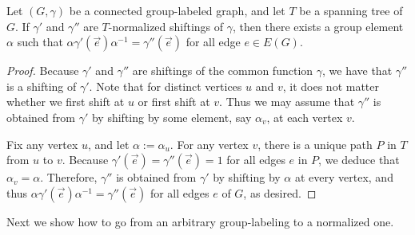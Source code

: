 \documentclass[a4paper, 12pt]{article}
\newcommand{\RMM}[1]{\textcolor{orange}{RM: #1}}
\begin{document}
\begin{lemma}
\label{lem:normalizedShifting1}
    Let $(G,\gamma)$ be a connected group-labeled graph, and let $T$ be a spanning tree of $G$. If $\gamma'$ and $\gamma''$ are $T$-normalized shiftings of $\gamma$, then there exists a group element $\alpha$ such that $\alpha \gamma'(\vec{e}) \alpha^{-1} = \gamma''(\vec{e})$ for all edge $e \in E(G)$.
\end{lemma}
\begin{proof}
    Because $\gamma'$ and $\gamma''$ are shiftings of the common function $\gamma$, we have that $\gamma''$ is a shifting of $\gamma'$. Note that for distinct vertices $u$ and $v$, it does not matter whether we first shift at $u$ or first shift at $v$. Thus we may assume that $\gamma''$ is obtained from $\gamma'$ by shifting by some element, say $\alpha_v$, at each vertex $v$. 
    
    Fix any vertex $u$, and let $\alpha := \alpha_u$. For any vertex $v$, there is a unique path $P$ in $T$ from $u$ to $v$. Because $\gamma'(\vec{e}) = \gamma''(\vec{e}) = 1$ for all edges $e$ in $P$, we deduce that $\alpha_v = \alpha$. Therefore, $\gamma''$ is obtained from $\gamma'$ by shifting by $\alpha$ at every vertex, and thus $\alpha \gamma'(\vec{e}) \alpha^{-1} = \gamma''(\vec{e})$ for all edges $e$ of $G$, as desired.
\end{proof}

Next we show how to go from an arbitrary group-labeling to a normalized one.
\end{document}
